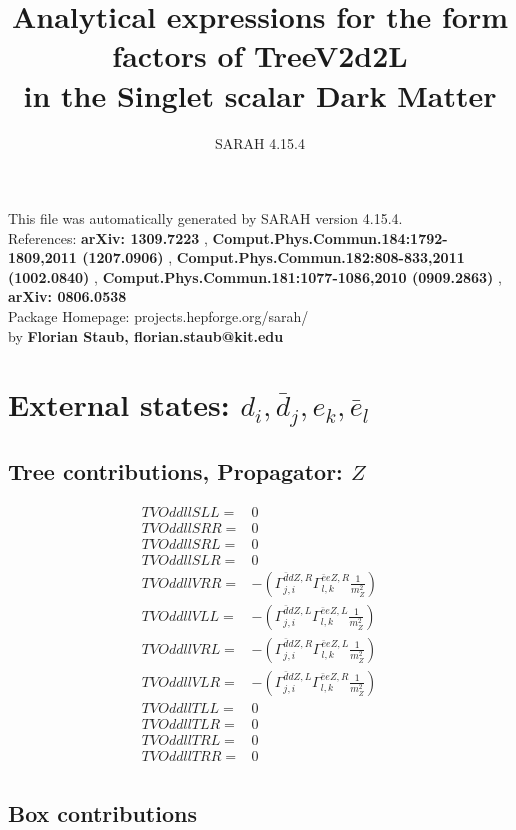 \documentclass[A4,landscape]{article}
\begin{document}
\title{Analytical expressions for the form factors of TreeV2d2L\\ in the Singlet scalar Dark Matter } 
 \author{SARAH 4.15.4} 
 \maketitle 
 \vspace{10cm} 
This file was automatically generated by SARAH version 4.15.4.  \\ 
References: {\bf arXiv: 1309.7223 }, {\bf Comput.Phys.Commun.184:1792-1809,2011 (1207.0906) }, {\bf Comput.Phys.Commun.182:808-833,2011 (1002.0840) }, {\bf Comput.Phys.Commun.181:1077-1086,2010 (0909.2863) }, {\bf arXiv: 0806.0538 } \\ 
Package Homepage: projects.hepforge.org/sarah/ \\ 
by {\bf Florian Staub, florian.staub@kit.edu} 
 \pagebreak 
 \tableofcontents 
 \pagebreak 
\section{External states: ${d_{{i}}, \bar{d}_{{j}}, e_{{k}}, \bar{e}_{{l}}}$} 
\subsection{Tree contributions, Propagator: $Z$} 

\begin{align} 
  TVOddllSLL= & 0 \\ 
  TVOddllSRR= & 0 \\ 
  TVOddllSRL= & 0 \\ 
  TVOddllSLR= & 0 \\ 
  TVOddllVRR= & -(\Gamma^{\bar{d}d Z ,R}_{j, i} \Gamma^{\bar{e}e Z ,R}_{l, k} \frac{1}{m^2_{Z}}) \\ 
  TVOddllVLL= & -(\Gamma^{\bar{d}d Z ,L}_{j, i} \Gamma^{\bar{e}e Z ,L}_{l, k} \frac{1}{m^2_{Z}}) \\ 
  TVOddllVRL= & -(\Gamma^{\bar{d}d Z ,R}_{j, i} \Gamma^{\bar{e}e Z ,L}_{l, k} \frac{1}{m^2_{Z}}) \\ 
  TVOddllVLR= & -(\Gamma^{\bar{d}d Z ,L}_{j, i} \Gamma^{\bar{e}e Z ,R}_{l, k} \frac{1}{m^2_{Z}}) \\ 
  TVOddllTLL= & 0 \\ 
  TVOddllTLR= & 0 \\ 
  TVOddllTRL= & 0 \\ 
  TVOddllTRR= & 0 \\ 
\end{align} 
\subsection{Box contributions} 
\end{document}

